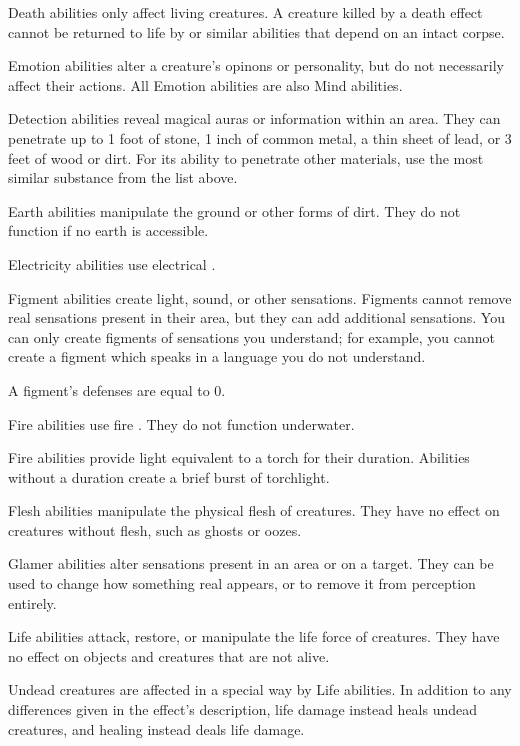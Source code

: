          Death abilities only affect living creatures.
        A creature killed by a death effect cannot be returned to life by  or similar abilities that depend on an intact corpse.

         Emotion abilities alter a creature's opinons or personality, but do not necessarily affect their actions.
        All Emotion abilities are also Mind abilities.

         Detection abilities reveal magical auras or information within an area.
        They can penetrate up to 1 foot of stone, 1 inch of common metal, a thin sheet of lead, or 3 feet of wood or dirt.
        For its ability to penetrate other materials, use the most similar substance from the list above.

         Earth abilities manipulate the ground or other forms of dirt.
        They do not function if no earth is accessible.

         Electricity abilities use electrical .

         Figment abilities create light, sound, or other sensations.
        Figments cannot remove real sensations present in their area, but they can add additional sensations.
        You can only create figments of sensations you understand; for example, you cannot create a figment which speaks in a language you do not understand.
        \par A figment's defenses are equal to 0.

         Fire abilities use fire . They do not function underwater.
        \par Fire abilities provide light equivalent to a torch for their duration.
        Abilities without a duration create a brief burst of torchlight.

         Flesh abilities manipulate the physical flesh of creatures.
        They have no effect on creatures without flesh, such as ghosts or oozes.

         Glamer abilities alter sensations present in an area or on a target.
        They can be used to change how something real appears, or to remove it from perception entirely.

         Life abilities attack, restore, or manipulate the life force of creatures.
        They have no effect on objects and creatures that are not alive.
        \par Undead creatures are affected in a special way by Life abilities.
        In addition to any differences given in the effect's description, life damage instead heals undead creatures, and healing instead deals life damage.

